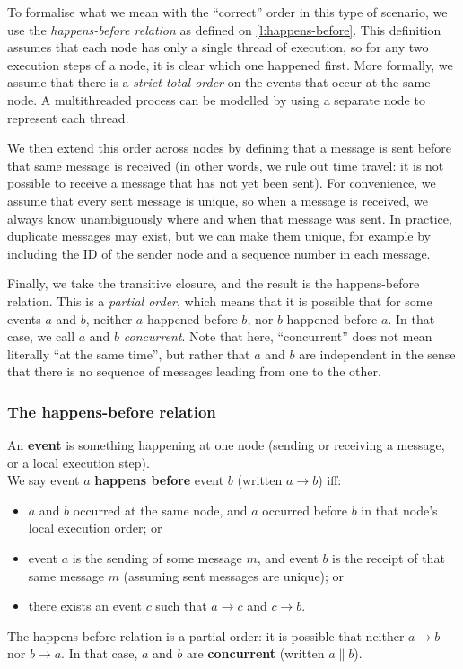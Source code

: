 To formalise what we mean with the ``correct'' order in this type of scenario, we use the \emph{happens-before relation} as defined on \autoref{l:happens-before}.
This definition assumes that each node has only a single thread of execution, so for any two execution steps of a node, it is clear which one happened first.
More formally, we assume that there is a \emph{strict total order} on the events that occur at the same node.
A multithreaded process can be modelled by using a separate node to represent each thread.

We then extend this order across nodes by defining that a message is sent before that same message is received (in other words, we rule out time travel: it is not possible to receive a message that has not yet been sent).
For convenience, we assume that every sent message is unique, so when a message is received, we always know unambiguously where and when that message was sent.
In practice, duplicate messages may exist, but we can make them unique, for example by including the ID of the sender node and a sequence number in each message.

Finally, we take the transitive closure, and the result is the happens-before relation.
This is a \emph{partial order}, which means that it is possible that for some events $a$ and $b$, neither $a$ happened before $b$, nor $b$ happened before $a$.
In that case, we call $a$ and $b$ \emph{concurrent}.
Note that here, ``concurrent'' does not mean literally ``at the same time'', but rather that $a$ and $b$ are independent in the sense that there is no sequence of messages leading from one to the other.


\begin{frame}
    \label{s:happens-before}
    \frametitle{The happens-before relation}
    An \textbf{event} is something happening at one node (sending or receiving a message, or a local execution step).\\[1em]
    We say event $a$ \textbf{happens before} event $b$ (written $a \rightarrow b$) iff:\pause
    \begin{itemize}
        \item $a$ and $b$ occurred at the same node, and $a$ occurred before $b$ in that node's local execution order; or\pause
        \item event $a$ is the sending of some message $m$, and event $b$ is the receipt of that same message $m$ (assuming sent messages are unique); or\pause
        \item there exists an event $c$ such that $a \rightarrow c$ and $c \rightarrow b$.\\[1em]\pause
    \end{itemize}
    The happens-before relation is a partial order:
    it is possible that neither $a \rightarrow b$ nor $b \rightarrow a$.
    In that case, $a$ and $b$ are \textbf{concurrent} (written $a \parallel b$).
\end{frame}
\label{l:happens-before}

